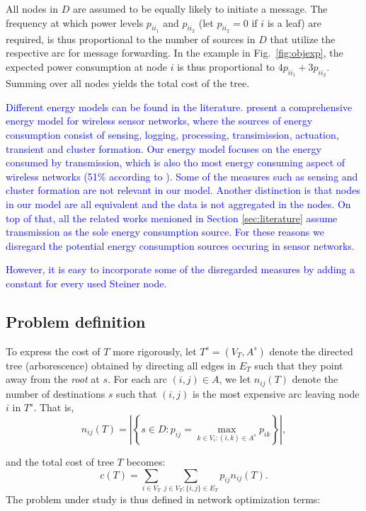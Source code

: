 All nodes in $D$ are assumed to be equally likely to initiate a message.
The frequency at which power levels $p_{ii_1}$ and $p_{ii_2}$ (let $p_{ii_2}=0$ if $i$ is a leaf) are required,
is thus proportional to the number of sources in $D$ that utilize the respective arc for message forwarding.
In the example in Fig.\ \ref{fig:objexp}, the expected power consumption at node $i$ is thus proportional to $4p_{ii_1} + 3p_{ii_2}$.
Summing over all nodes yields the total cost of the tree.

\textcolor{blue}{
Different energy models can be found in the literature. 
\cite{halgamuge} present a comprehensive energy model for wireless sensor networks, 
where the sources of energy consumption consist of sensing, logging, processing, transimission, actuation, transient and cluster formation.
Our energy model focuses on the energy consumed by transmission, which is also tho most energy consuming aspect of wireless networks (51\% according to \cite{halgamuge}).
Some of the measures such as sensing and cluster formation are not relevant in our model.
Another distinction is that nodes in our model are all equivalent and the data is not aggregated in the nodes.
On top of that, all the related works menioned in Section \ref{sec:literature} assume transmission as the sole energy consumption source. 
For these reasons we disregard the potential energy consumption sources occuring in sensor networks.}

\textcolor{blue}{
However, it is easy to incorporate some of the disregarded measures by adding a constant for every used Steiner node.}

\subsection{Problem definition} \label{sec:probdef}

To express the cost of $T$ more rigorously, let $T^s=(V_T,A^s)$ denote the directed tree (arborescence) obtained by directing all edges in $E_T$ such that they point away from the \emph{root} at $s$.
For each arc $(i,j)\in A$, we let $n_{ij}(T)$ denote the number of destinations $s$ such that $(i,j)$ is the most expensive arc leaving node $i$ in $T^s$.
That is,
\[
  n_{ij}(T) = \left|\left\{s\in D: p_{ij}=\max_{k\in V_i: (i,k)\in A^s}p_{ik}\right\}\right|,
\]

\noindent
and the total cost of tree $T$ becomes:
$$
  c(T) = \sum_{i\in V_T}\sum_{j\in V_T:\{i,j\}\in E_T}p_{ij}n_{ij}(T).
$$ 
The problem under study is thus defined in network optimization terms:

